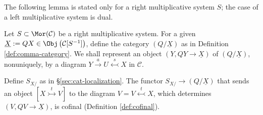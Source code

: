 The following lemma is stated only for a right multiplicative system $S$; the
case of a left multiplicative system is dual.

\begin{lemma}\label{prop:injective-localization-prep}
	Let $S\subset\Mor(\mathcal{C})$ be a right multiplicative system. For a
	given $\underline{X}:=QX\in
	\Obj\left(\mathcal{C}[S^{-1}]\right)$, define the category
	$(Q/\underline{X})$ as in Definition \ref{def:comma-category}. We shall
	represent an object $(Y,QY\to\underline{X})$ of $(Q/\underline{X})$,
	nonuniquely, by a diagram
	$Y\xrightarrow{a}U\stackrel{s}{\leftarrowtail}X$ in $\mathcal{C}$.

	Define $S_{X/}$ as in \S\ref{sec:cat-localization}. The functor
	$S_{X/}\to(Q/\underline{X})$ that sends an object
	$[X\stackrel{t}{\rightarrowtail}V]$ to the diagram
	$V=V\stackrel{t}{\leftarrowtail}X$, which determines
	$(V,QV\to\underline{X})$, is cofinal (Definition \ref{def:cofinal}).
\end{lemma}
